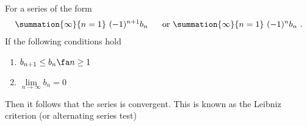 \documentclass{report}
\title{\Huge{}}
\author{\huge{Nathan Warner}}
\date{\huge{}}
\begin{document}
    \begin{remark}
        For a series of the form
        \begin{align*}
            \summation{\infty}{n=1}\ (-1)^{n+1}b_{n}\  \quad \text{ or } \summation{\infty}{n=1}\ (-1)^{n}b_{n}\ 
        .\end{align*}
        If the following conditions hold
        \begin{enumerate}[label=\roman*.]
            \item $b_{n+1} \leq b_{n} \fa   n \geq 1 $
            \item $\lim\limits_{n \to \infty}{b_{n}} = 0 $
        \end{enumerate}
        Then it follows that the series is convergent. This is known as the Leibniz criterion (or alternating series test)
    \end{remark}
\end{document}
